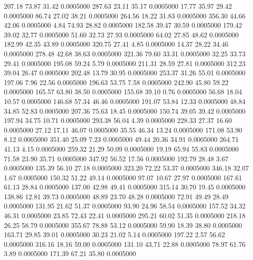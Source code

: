  207.18   73.87   31.42   0.0005000
 287.63   23.11   35.17   0.0005000
  17.77   35.97   29.42   0.0005000
  86.74   27.02   38.21   0.0005000
 264.56   18.22   31.83   0.0005000
 356.30   44.66   42.06   0.0005000
   4.84   74.93   28.82   0.0005000
 182.58   39.47   30.59   0.0005000
 179.42   39.02   32.77   0.0005000
  51.60   32.73   27.93   0.0005000
  64.02   27.85   48.62   0.0005000
 182.99   42.35   43.89   0.0005000
 320.75   27.41    4.85   0.0005000
  14.37   28.22   34.46   0.0005000
 278.48   42.68   38.63   0.0005000
 321.36   79.60   33.31   0.0005000
  32.25   33.73   29.41   0.0005000
 195.08   59.24    5.79   0.0005000
 211.31   28.59   27.81   0.0005000
 312.23   39.04   26.47   0.0005000
 202.48   13.79   30.95   0.0005000
 253.37   31.26   55.01   0.0005000
 197.06    7.96   22.56   0.0005000
 196.63   53.75    7.58   0.0005000
 242.90   45.80   59.22   0.0005000
 165.57   63.80   38.50   0.0005000
 155.68   39.10    0.76   0.0005000
  56.68   18.04   10.57   0.0005000
 146.68   57.34   46.46   0.0005000
 191.07   53.84   12.33   0.0005000
  48.84   34.85   52.83   0.0005000
 207.36   75.63   18.45   0.0005000
 150.74   39.05   39.42   0.0005000
 197.94   34.75   10.71   0.0005000
 293.38   56.04    4.39   0.0005000
 228.33   27.37   16.60   0.0005000
  27.12   17.11   46.07   0.0005000
  35.55   46.34   13.24   0.0005000
 171.08   53.90    8.12   0.0005000
 351.40   25.09    7.23   0.0005000
  49.44   20.36   34.91   0.0005000
 264.71   41.13    4.15   0.0005000
 259.32   21.29   50.09   0.0005000
  19.19   65.94   55.83   0.0005000
  71.58   23.90   35.71   0.0005000
 347.92   56.52   17.56   0.0005000
 192.79   28.48    3.67   0.0005000
 135.39   56.10   27.18   0.0005000
 323.20   72.22   53.37   0.0005000
 346.18   32.07    1.67   0.0005000
 150.32   51.22   49.14   0.0005000
  97.07   10.67   27.97   0.0005000
 167.61   61.13   28.84   0.0005000
 137.00   42.98   49.41   0.0005000
 315.14   30.70   19.45   0.0005000
 138.86   12.81   39.73   0.0005000
  48.89   23.70   48.28   0.0005000
  72.91   49.49   28.49   0.0005000
 131.95   21.62   51.37   0.0005000
  93.90   24.96   58.54   0.0005000
 157.52   34.32   46.31   0.0005000
  23.85   72.43   22.41   0.0005000
 295.21   60.02   51.35   0.0005000
 218.18   26.25   58.79   0.0005000
 355.67   78.88   53.12   0.0005000
  59.90   18.39   38.80   0.0005000
 163.71   29.85   39.01   0.0005000
  30.23   21.02    5.14   0.0005000
 197.22    2.57   56.62   0.0005000
 316.16   18.16   59.00   0.0005000
 131.10   43.71   22.88   0.0005000
  78.97   61.76    3.89   0.0005000
 171.39   67.21   35.80   0.0005000
